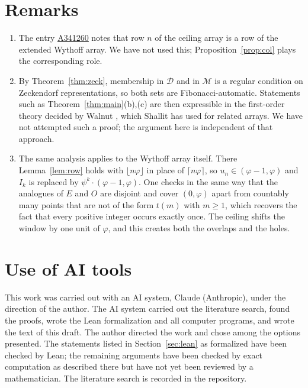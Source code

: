 \documentclass[12pt]{article}
\newcommand{\seqnum}[1]{\href{https://oeis.org/#1}{\underline{#1}}}
\newcommand{\fl}[1]{\lfloor #1 \rfloor}
\newcommand{\cl}[1]{\lceil #1 \rceil}
\newcommand{\D}{\mathcal{D}}
\newcommand{\M}{\mathcal{M}}
\theoremstyle{plain}
\theoremstyle{remark}
\begin{document}
\section{Remarks}\label{sec:remarks}

\begin{enumerate}
\item The entry \seqnum{A341260} notes that row $n$ of the ceiling array is a row of the extended
Wythoff array. We have not used this; Proposition~\ref{prop:col} plays the corresponding role.
\item By Theorem~\ref{thm:zeck}, membership in $\D$ and in $\M$ is a regular condition on
Zeckendorf representations, so both sets are Fibonacci-automatic. Statements such as
Theorem~\ref{thm:main}(b),(c) are then expressible in the first-order theory decided by Walnut
\cite{mousavi,shallitbook}, which Shallit \cite{shallit25} has used for related arrays. We have not
attempted such a proof; the argument here is independent of that approach.
\item The same analysis applies to the Wythoff array itself. There Lemma~\ref{lem:row} holds with
$\fl{n\varphi}$ in place of $\cl{n\varphi}$, so $u_n\in(\varphi-1,\varphi)$ and $I_k$ is replaced by
$\psi^k\cdot(\varphi-1,\varphi)$. One checks in the same way that the analogues of $E$ and $O$ are
disjoint and cover $(0,\varphi)$ apart from countably many points that are not of the form $t(m)$
with $m\ge1$, which recovers the fact that every positive integer occurs exactly once. The
ceiling shifts the window by one unit of $\varphi$, and this creates both the overlaps and the
holes.
\end{enumerate}

\section{Use of AI tools}\label{sec:ai}

This work was carried out with an AI system, Claude (Anthropic), under the direction of the
author. The AI system carried out the literature search, found the proofs, wrote the Lean
formalization and all computer programs, and wrote the text of this draft. The author directed
the work and chose among the options presented. The statements listed in
Section~\ref{sec:lean} as formalized have been checked by Lean; the remaining arguments have been
checked by exact computation as described there but have not yet been reviewed by a
mathematician. The literature search is recorded in the repository.
\end{document}
